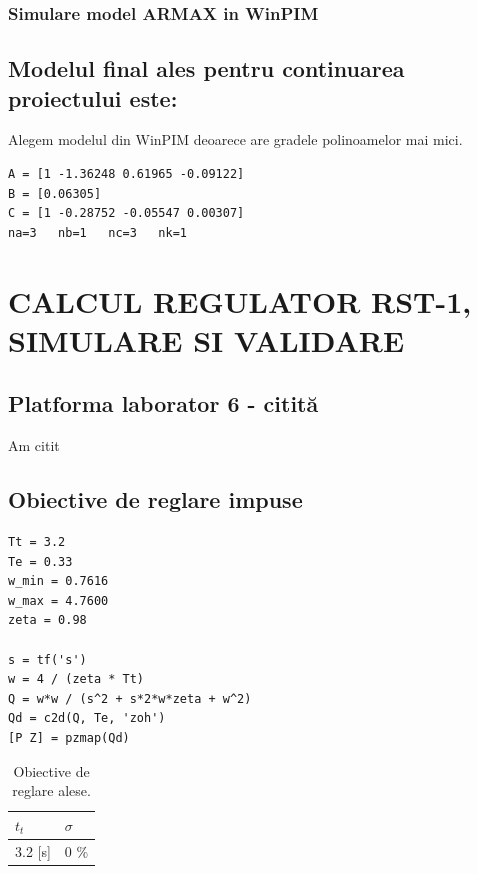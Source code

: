 \documentclass[12pt,english]{article}
\begin{document}
\subsubsection {Simulare model ARMAX in WinPIM }
\begin{center}
\end{center}
\subsection {Modelul final ales pentru continuarea proiectului este: }
Alegem modelul din WinPIM deoarece are gradele polinoamelor mai mici.
\begin{lstlisting}
A = [1 -1.36248 0.61965 -0.09122]
B = [0.06305]
C = [1 -0.28752 -0.05547 0.00307]
na=3   nb=1   nc=3   nk=1
\end{lstlisting}

\section {CALCUL REGULATOR RST-1, SIMULARE SI VALIDARE }
\subsection {Platforma laborator 6 - citită }
Am citit
\subsection {Obiective de reglare impuse}
\begin{lstlisting}
Tt = 3.2
Te = 0.33
w_min = 0.7616
w_max = 4.7600
zeta = 0.98

s = tf('s')
w = 4 / (zeta * Tt)
Q = w*w / (s^2 + s*2*w*zeta + w^2)
Qd = c2d(Q, Te, 'zoh')
[P Z] = pzmap(Qd)
\end{lstlisting}

\begin{table}[H]
  \centering
    \begin{tabular}{|l|l|}
      \hline
      $t_t$ & $\sigma$ \\
      \hline
      3.2 [s] & 0 \% \\
      \hline
    \end{tabular}
    \caption{Obiective de reglare alese.}
\end{table}
\end{document}
